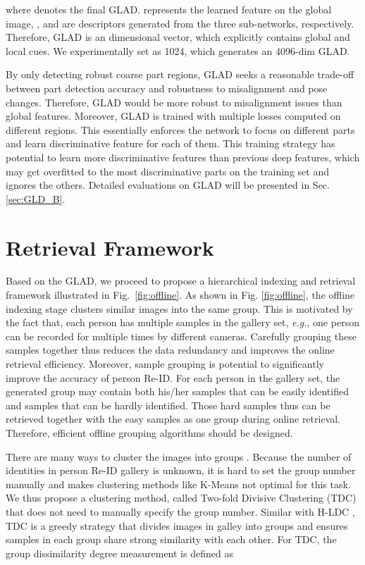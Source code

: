 \documentclass[sigconf]{acmart}
\begin{document}
where  denotes the final GLAD.  represents the learned feature on the global image, ,  and  are descriptors generated from the three sub-networks, respectively. Therefore, GLAD is an  dimensional vector, which explicitly contains global and local cues. We experimentally set  as 1024, which generates an 4096-dim GLAD.

By only detecting robust coarse part regions, GLAD seeks a reasonable trade-off between part detection accuracy and robustness to misalignment and pose changes. Therefore, GLAD would be more robust to misalignment issues than global features. Moreover, GLAD is trained with multiple losses computed on different regions. This essentially enforces the network to focus on different parts and learn discriminative feature for each of them. This training strategy has potential to learn more discriminative features than previous deep features, which may get overfitted to the most discriminative parts on the training set and ignores the others. Detailed evaluations on GLAD will be presented in Sec. \ref{sec:GLD_B}.

\section{Retrieval Framework}
\label{sec:retrieval}



Based on the GLAD, we proceed to propose a hierarchical indexing and retrieval framework illustrated in Fig.~\ref{fig:offline}. As shown in Fig. \ref{fig:offline}, the offline indexing stage clusters similar images into the same group. This is motivated by the fact that, each person has multiple samples in the gallery set, \emph{e.g.}, one person can be recorded for multiple times by different cameras. Carefully grouping these samples together thus reduces the data redundancy and improves the online retrieval efficiency. Moreover, sample grouping is potential to significantly improve the accuracy of person Re-ID. For each person in the gallery set, the generated group may contain both his/her samples that can be easily identified and samples that can be hardly identified. Those hard samples thus can be retrieved together with the easy samples as one group during online retrieval. Therefore, efficient offline grouping algorithms should be designed.

There are many ways to cluster the images into groups \cite{clustering_Zhang}. Because the number of identities in person Re-ID gallery is unknown, it is hard to set the group number manually and makes clustering methods like K-Means \cite{kmeans} not optimal for this task. We thus propose a clustering method, called Two-fold Divisive Clustering (TDC) that does not need to manually specify the group number. Similar with H-LDC \cite{MTM}, TDC is a greedy strategy that divides images in galley into groups and ensures samples in each group share strong similarity with each other. For TDC, the group dissimilarity degree measurement is defined as
\end{document}

